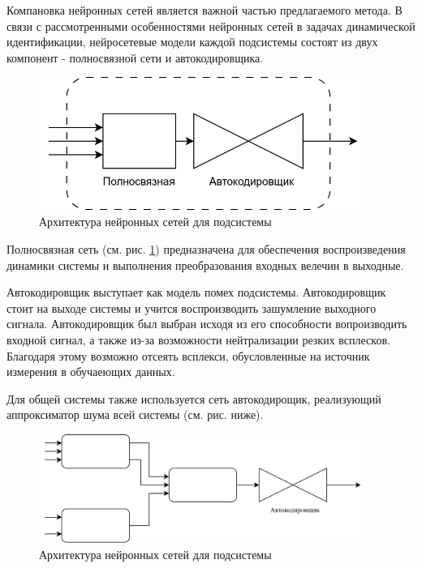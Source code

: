 Компановка нейронных сетей является важной частью предлагаемого метода. В связи
с рассмотренными особенностями нейронных сетей в задачах динамической
идентификации, нейросетевые модели каждой подсистемы состоят из двух компонент -
полносвязной сети и автокодировщика. 

\begin{figure}[H]
  \begin{center}
    \includegraphics[width=0.95\textwidth]{figures/nn_system.png}
  \end{center}
  \caption{Архитектура нейронных сетей для подсистемы}\label{fig:nn:system}
\end{figure}

Полносвязная сеть (см. рис. \ref{fig:nn:system}) предназначена для обеспечения
воспроизведения динамики системы и выполнения преобразования входных велечин в
выходные. 

Автокодировщик выступает как модель помех подсистемы. Автокодировщик стоит на
выходе системы и учится воспроизводить зашумление выходного сигнала.
Автокодировщик был выбран исходя из его способности вопроизводить входной
сигнал, а также из-за возможности нейтрализации резких всплесков. Благодаря
этому возможно отсеять всплекси, обусловленные на источник измерения в
обучаеющих данных. 


Для общей системы также используется сеть автокодирощик, реализующий
аппроксиматор шума всей системы (см. рис. ниже).

\begin{figure}[H]
  \begin{center}
    \includegraphics[width=0.95\textwidth]{figures/nn_full.png}
  \end{center}
  \caption{Архитектура нейронных сетей для подсистемы}\label{fig:nn:full}
\end{figure}

